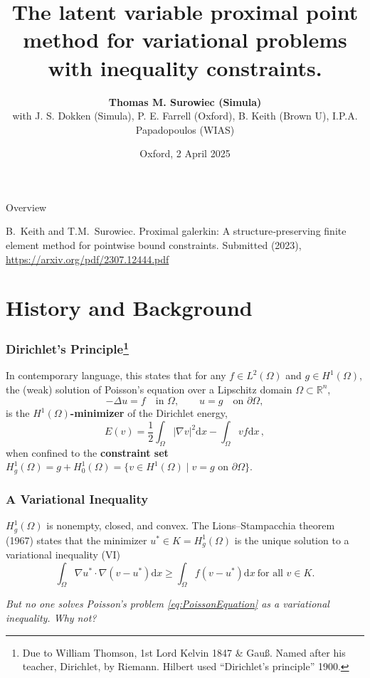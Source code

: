 \documentclass[aspectratio=169,xcolor=dvipsnames,11pt]{beamer}
\title[]{The latent variable proximal point method for variational problems with inequality constraints.
 } %
\author{\small{\bf Thomas M. Surowiec (Simula)}\\  \footnotesize with J. S. Dokken (Simula), P. E. Farrell (Oxford),  B. Keith (Brown U), I.P.A. Papadopoulos (WIAS) }
\institute[\phantom{xxxxxxxxxxxxxxxxxxxxx}]{Department of Numerical Analysis and Scientific Computing \newline Simula Research Laboratory \newline Oslo, Norway}
\date{ 
Oxford, 2 April 2025}
\newcommand{\dd}{\mathrm{d}}
\newcommand{\fa}{\text{for all }}
\begin{document}
\frame{\titlepage}

\begin{frame}{Overview}
\tableofcontents
\begin{thebibliography}{1}

{\sc B.~Keith and T.M.~Surowiec.}
\newblock Proximal galerkin: A structure‐preserving finite element method for pointwise bound constraints.
\newblock Submitted (2023), \url{https://arxiv.org/pdf/2307.12444.pdf}
\end{thebibliography}
\end{frame}

\section{History and Background}
\begin{frame}\frametitle{Dirichlet's Principle\footnote{\tiny  Due to William Thomson, 1st Lord Kelvin 1847 \& Gau\ss. Named after his teacher, Dirichlet, by Riemann. Hilbert used ``Dirichlet's principle'' 1900.}}

 In contemporary language, this states that for any $f\in L^2(\Omega)$ and $g\in H^1(\Omega)$, the (weak) solution of Poisson's equation over a Lipschitz domain $\Omega \subset \mathbb{R}^n$,
\begin{equation}
\label{eq:PoissonEquation}
	-\Delta u = f
	\quad \text{in~} \Omega,
	\qquad
	u = g \quad \text{on~} \partial\Omega,
\end{equation}
is the \textbf{$H^1(\Omega)$-minimizer} of the Dirichlet energy,
\begin{equation}
\label{eq:DirichletEnergy}
	E(v)
	=
	\frac{1}{2}
	\int_\Omega |\nabla v|^2 \dd x
	-
	\int_\Omega v f \dd x
	\,,
\end{equation}
when confined to the \textbf{constraint set} $H^1_g(\Omega) = g + H^1_0(\Omega) = \{ v \in H^1(\Omega) \mid v = g \text{~on~} \partial \Omega\}$.

\end{frame}

\begin{frame}\frametitle{A Variational Inequality}
$H^1_g(\Omega)$ is nonempty, closed, and convex. The Lions--Stampacchia theorem (1967) states that the minimizer $u^\ast \in K = H^1_g(\Omega)$ is the unique solution to a variational inequality (VI)
\begin{equation*}
	\int_\Omega \nabla u^\ast \cdot \nabla (v - u^*)  \dd x \geq \int_\Omega f (v - u^*) \dd x
	~\fa v \in K.
\end{equation*}
\pause
\begin{center}\textit{
But no one solves Poisson's problem \eqref{eq:PoissonEquation} as a variational inequality. Why not?}
\end{center}
\end{frame}
\end{document}
